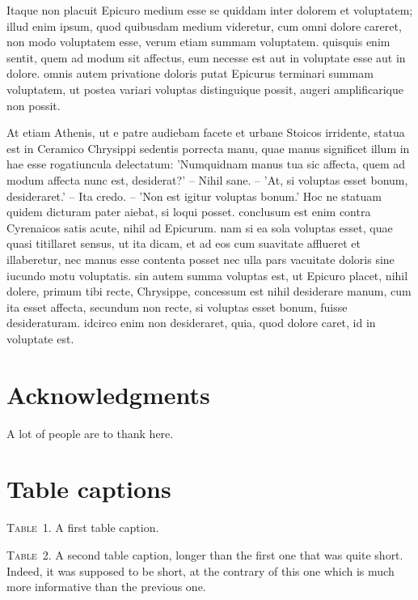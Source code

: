 \documentclass[a4paper,12pt]{article}
\begin{document}
Itaque non placuit Epicuro medium esse se quiddam inter dolorem et voluptatem; illud enim
ipsum, quod quibusdam medium videretur, cum omni dolore careret, non modo voluptatem esse,
verum etiam summam voluptatem. quisquis enim sentit, quem ad modum sit affectus, eum
necesse est aut in voluptate esse aut in dolore. omnis autem privatione doloris putat
Epicurus terminari summam voluptatem, ut postea variari voluptas distinguique possit,
augeri amplificarique non possit.

At etiam Athenis, ut e patre audiebam facete et urbane Stoicos irridente, statua est in
Ceramico Chrysippi sedentis porrecta manu, quae manus significet illum in hae esse
rogatiuncula delectatum: 'Numquidnam manus tua sic affecta, quem ad modum affecta nunc
est, desiderat?' -- Nihil sane. -- 'At, si voluptas esset bonum, desideraret.' -- Ita
credo. -- 'Non est igitur voluptas bonum.' Hoc ne statuam quidem dicturam pater aiebat, si
loqui posset. conclusum est enim contra Cyrenaicos satis acute, nihil ad Epicurum. nam si
ea sola voluptas esset, quae quasi titillaret sensus, ut ita dicam, et ad eos cum
suavitate afflueret et illaberetur, nec manus esse contenta posset nec ulla pars vacuitate
doloris sine iucundo motu voluptatis. sin autem summa voluptas est, ut Epicuro placet,
nihil dolere, primum tibi recte, Chrysippe, concessum est nihil desiderare manum, cum ita
esset affecta, secundum non recte, si voluptas esset bonum, fuisse desideraturam. idcirco
enim non desideraret, quia, quod dolore caret, id in voluptate est.


\section*{Acknowledgments}

A lot of people are to thank here.


\newpage





\newpage


\section*{Table captions}


\noindent \textsc{Table}~1. A first table caption.

\bigskip

\noindent \textsc{Table}~2. A second table caption, longer than the first one that was
quite short. Indeed, it was supposed to be short, at the contrary of this one which is
much more informative than the previous one.
\end{document}
